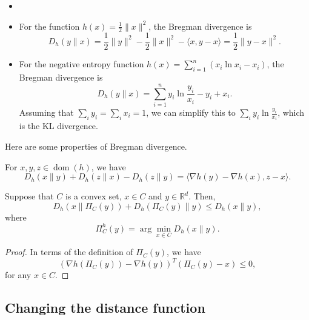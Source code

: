 \begin{example}
\label{eg: Examples of Bregman Divergence}
\begin{itemize}
    \item []
    \item For the function $h(x)=\frac{1}{2}\|x\|^2$, the Bregman divergence is
    $$
    D_h(y \| x)=\frac{1}{2}\|y\|^2-\frac{1}{2}\|x\|^2-\langle x, y-x\rangle=\frac{1}{2}\|y-x\|^2 .
    $$
    \item For the negative entropy function $h(x)=\sum_{i=1}^n\left(x_i \ln x_i-x_i\right)$, the Bregman divergence is
    $$
    D_h(y \| x)=\sum_{i=1}^n y_i \ln \frac{y_i}{x_i}-y_i+x_i .
    $$
    Assuming that $\sum_i y_i=\sum_i x_i=1$, we can simplify this to $\sum_i y_i \ln \frac{y_i}{x_i}$, which is the KL divergence.
\end{itemize}
\end{example}

Here are some properties of Bregman divergence. 

\begin{lemma}
\label{lem: Three-point property}
For $x, y, z \in \operatorname{dom}(h)$, we have
$$
D_h(x \| y)+D_h(z \| x)-D_h(z \| y)=\langle\nabla h(y)-\nabla h(x), z-x\rangle .
$$
\end{lemma}


\begin{lemma}
\label{lem: Pythagoras theorem}
Suppose that $C$ is a convex set, $x \in C$ and $y \in \mathbb{R}^d$. Then,
$$
D_h\left(x \| \Pi_C(y)\right)+D_h\left(\Pi_C(y) \| y\right) \leqslant D_h(x \| y),
$$
where
$$
\Pi_C^h(y)=\arg \min _{x \in C} D_h(x \| y) .
$$
\end{lemma}
\begin{proof}
    In terms of the definition of $\Pi_C(y)$, we have
    $$
    \left(\nabla h\left(\Pi_C(y)\right)-\nabla h(y) \right)^T\left(\Pi_C(y)-x\right) \leqslant 0,
    $$
    for any $x \in C$.
\end{proof}

\subsection{Changing the distance function}

